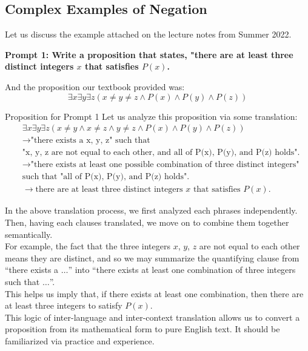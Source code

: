\subsection{Complex Examples of Negation}
Let us discuss the example attached on the lecture notes from Summer 2022.
\begin{center}
    \textbf{Prompt 1: Write a proposition that states, "there are at least three distinct integers $x$ that satisfies $P(x)$.}
\end{center}
And the proposition our textbook provided was:
\[\exists x \exists y \exists z (x \neq y \neq z \land P(x) \land P(y) \land P(z))\]
\begin{ln-think}{Proposition for Prompt 1}{}
    Let us analyze this proposition via some translation:
    \begin{align*}
        &\exists x \exists y \exists z (x \neq y \land x \neq z \land y \neq z \land P(x) \land P(y) \land P(z)) \\
        &\rightarrow \text{"there exists a x, y, z" such that} \\
        & \text{"x, y, z are not equal to each other, and all of P(x), P(y), and P(z) holds".} \\
        &\rightarrow \text{"there exists at least one possible combination of three distinct integers"} \\
        & \text{such that "all of P(x), P(y), and P(z) holds".} \\
        &\rightarrow \text{there are at least three distinct integers $x$ that satisfies $P(x)$.}
    \end{align*}
\end{ln-think}
In the above translation process, we first analyzed each phrases independently. Then, having each clauses translated, we move on to combine them together semantically. \\
For example, the fact that the three integers $x$, $y$, $z$ are not equal to each other means they are distinct, and so we may summarize the quantifying clause from ``there exists a $\dots$'' into ``there exists at least one combination of three integers such that $\dots$''. \\
This helps us imply that, if there exists at least one combination, then there are at least three integers to satisfy $P(x)$. \\
This logic of inter-language and inter-context translation allows us to convert a proposition from its mathematical form to pure English text. It should be familiarized via practice and experience. \\
